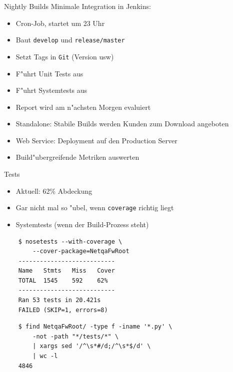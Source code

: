 \documentclass{beamer}
\begin{document}
\begin{frame}{Nightly Builds}
	Minimale Integration in Jenkins:
	\begin{itemize}
		\item Cron-Job, startet um 23 Uhr
		\item Baut \texttt{develop} und \texttt{release/master}
		\item Setzt Tags in \texttt{Git} (Version usw)
		\item F"uhrt Unit Tests aus
		\item F"uhrt Systemtests aus
		\item Report wird am n"achsten Morgen evaluiert
		\item Standalone: Stabile Builds werden Kunden zum Download angeboten
		\item Web Service: Deployment auf den Production Server
		\item Build"ubergreifende Metriken auswerten
	\end{itemize}
\end{frame}

\begin{frame}[fragile]{Tests}
	\begin{itemize}
		\item Aktuell: 62\% Abdeckung
		\item Gar nicht mal so "ubel, wenn \texttt{coverage} richtig liegt
		\item Systemtests (wenn der Build-Prozess steht)
	\end{itemize}
	
	\begin{overprint}
	\begin{verbatim}
	$ nosetests --with-coverage \
		--cover-package=NetqaFwRoot
	---------------------------
	Name   Stmts   Miss   Cover
	TOTAL  1545    592    62%
	---------------------------
	Ran 53 tests in 20.421s
	FAILED (SKIP=1, errors=8)
	\end{verbatim}
	
	\begin{verbatim}
	$ find NetqaFwRoot/ -type f -iname '*.py' \
		-not -path "*/tests/*" \
		| xargs sed '/^\s*#/d;/^\s*$/d' \
		| wc -l
	4846
	\end{verbatim}
	\end{overprint}
\end{frame}
\end{document}
